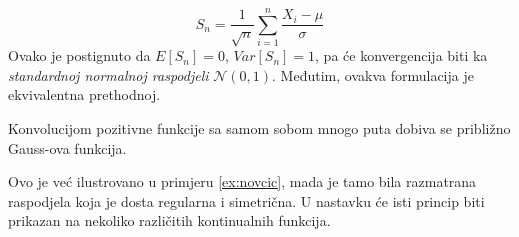 $$S_n = \frac{1}{\sqrt{n}} \sum_{i=1}^{n} \frac{X_i-\mu}{\sigma}$$
Ovako je postignuto da $E[S_n] = 0$, $Var[S_n] = 1$, pa će konvergencija biti
ka \textit{standardnoj normalnoj raspodjeli} $\mathcal{N}(0,1)$.
Međutim, ovakva formulacija je ekvivalentna prethodnoj.

\begin{corollary}
  Konvolucijom pozitivne funkcije sa samom sobom mnogo puta dobiva se približno
  Gauss-ova funkcija.
\end{corollary}
Ovo je već ilustrovano u primjeru \ref{ex:novcic}, mada je tamo bila razmatrana
raspodjela koja je dosta regularna i simetrična. U nastavku će isti princip biti
prikazan na nekoliko različitih kontinualnih funkcija.

